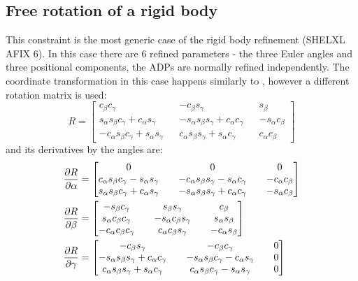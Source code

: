 \documentclass[pdf]{iucr}
\begin{document}
\subsection{Free rotation of a rigid body}
\label{sec:free:rotated:group}
This constraint is the most generic case of the rigid body refinement (SHELXL AFIX 6). In this case there are 6 refined parameters - the three Euler angles and three positional components, the ADPs are normally refined independently. The coordinate transformation in this case happens similarly to , however a different rotation matrix is used:
\begin{equation}
R = \begin{bmatrix} \label{eq:erm}
   c_\beta c_\gamma && - c_\beta s_\gamma &&  s_\beta \\
   s_\alpha s_\beta c_\gamma +  c_\alpha s_\gamma && - s_\alpha s_\beta s_\gamma+ c_\alpha c_\gamma && - s_\alpha c_\beta \\
  - c_\alpha s_\beta c_\gamma+ s_\alpha s_\gamma &&  c_\alpha s_\beta s_\gamma+ s_\alpha c_\gamma &&  c_\alpha c_\beta
\end{bmatrix}
\end{equation}
and its derivatives by the angles are:
\begin{align}
\frac{\partial R}{\partial \alpha} &= \begin{bmatrix}
  0 && 0 && 0 \\
   c_\alpha s_\beta c_\gamma -  s_\alpha s_\gamma && - c_\alpha s_\beta s_\gamma- s_\alpha c_\gamma && - c_\alpha c_\beta \\
   s_\alpha s_\beta c_\gamma+ c_\alpha s_\gamma && - s_\alpha s_\beta s_\gamma+ c_\alpha c_\gamma && - s_\alpha c_\beta
\end{bmatrix}
\\
\frac{\partial R}{\partial \beta} &= \begin{bmatrix}
  - s_\beta c_\gamma &&  s_\beta s_\gamma &&  c_\beta \\
   s_\alpha c_\beta c_\gamma && - s_\alpha c_\beta s_\gamma &&  s_\alpha s_\beta \\
  - c_\alpha c_\beta c_\gamma &&  c_\alpha c_\beta s_\gamma && - c_\alpha s_\beta
\end{bmatrix}
\\
\frac{\partial R}{\partial \gamma} &= \begin{bmatrix}
  - c_\beta s_\gamma && - c_\beta c_\gamma && 0 \\
  - s_\alpha s_\beta s_\gamma +  c_\alpha c_\gamma && - s_\alpha s_\beta c_\gamma- c_\alpha s_\gamma && 0 \\
   c_\alpha s_\beta s_\gamma+ s_\alpha c_\gamma &&  c_\alpha s_\beta c_\gamma- s_\alpha s_\gamma && 0
\end{bmatrix}
\end{align}
\end{document}
